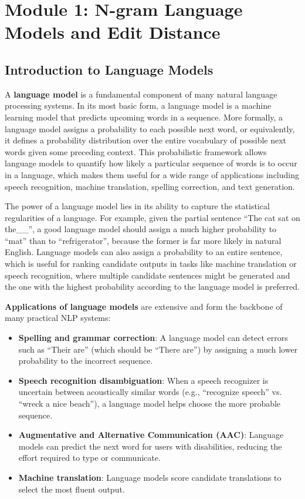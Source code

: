 \documentclass[11pt,a4paper]{article}
\begin{document}
\section{Module 1: N-gram Language Models and Edit Distance}

\subsection{Introduction to Language Models}

A \textbf{language model} is a fundamental component of many natural language processing systems. In its most basic form, a language model is a machine learning model that predicts upcoming words in a sequence. More formally, a language model assigns a probability to each possible next word, or equivalently, it defines a probability distribution over the entire vocabulary of possible next words given some preceding context. This probabilistic framework allows language models to quantify how likely a particular sequence of words is to occur in a language, which makes them useful for a wide range of applications including speech recognition, machine translation, spelling correction, and text generation.

The power of a language model lies in its ability to capture the statistical regularities of a language. For example, given the partial sentence ``The cat sat on the\_\_'', a good language model should assign a much higher probability to ``mat'' than to ``refrigerator'', because the former is far more likely in natural English. Language models can also assign a probability to an entire sentence, which is useful for ranking candidate outputs in tasks like machine translation or speech recognition, where multiple candidate sentences might be generated and the one with the highest probability according to the language model is preferred.

\textbf{Applications of language models} are extensive and form the backbone of many practical NLP systems:
\begin{itemize}
    \item \textbf{Spelling and grammar correction}: A language model can detect errors such as ``Their are'' (which should be ``There are'') by assigning a much lower probability to the incorrect sequence.
    \item \textbf{Speech recognition disambiguation}: When a speech recognizer is uncertain between acoustically similar words (e.g., ``recognize speech'' vs. ``wreck a nice beach''), a language model helps choose the more probable sequence.
    \item \textbf{Augmentative and Alternative Communication (AAC)}: Language models can predict the next word for users with disabilities, reducing the effort required to type or communicate.
    \item \textbf{Machine translation}: Language models score candidate translations to select the most fluent output.
\end{itemize}
\end{document}
